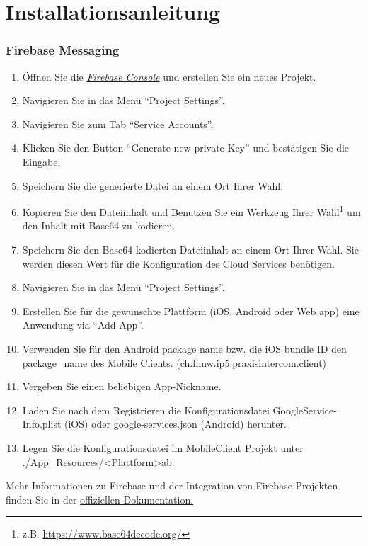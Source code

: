 
\section{Installationsanleitung}

\subsubsection*{Firebase Messaging}
\begin{enumerate}
    \item Öffnen Sie die \href{https://console.firebase.google.com/}{\textit{Firebase Console}} und erstellen Sie ein neues Projekt.
    \item Navigieren Sie in das Menü ``Project Settings''.
    \item Navigieren Sie zum Tab ``Service Accounts''.
    \item Klicken Sie den Button ``Generate new private Key'' und bestätigen Sie die Eingabe.
    \item Speichern Sie die generierte Datei an einem Ort Ihrer Wahl.
    \item Kopieren Sie den Dateiinhalt und Benutzen Sie ein Werkzeug Ihrer Wahl\footnote{z.B. \url{https://www.base64decode.org/}} um den Inhalt mit Base64 zu kodieren.
    \item Speichern Sie den Base64 kodierten Dateiinhalt an einem Ort Ihrer Wahl. Sie werden diesen Wert für die Konfiguration des Cloud Services benötigen.
    \item Navigieren Sie in das Menü ``Project Settings''.
    \item Erstellen Sie für die gewünschte Plattform (iOS, Android oder Web app) eine Anwendung via ``Add App''.
    \item Verwenden Sie für den Android package name bzw. die iOS bundle ID den package\_name des Mobile Clients. (ch.fhnw.ip5.praxisintercom.client)
    \item Vergeben Sie einen beliebigen App-Nickname.
    \item Laden Sie nach dem Registrieren die Konfigurationsdatei GoogleService-Info.plist (iOS) oder google-services.json (Android) herunter.
    \item Legen Sie die Konfigurationsdatei im MobileClient Projekt unter ./App\_Resources/\textless Plattform\textgreater ab.
\end{enumerate}

Mehr Informationen zu Firebase und der Integration von Firebase Projekten finden Sie in der \href{https://firebase.google.com/docs/projects/learn-more#setting_up_a_firebase_project_and_registering_apps}{offiziellen Dokumentation.}\cite{understand-firebase}


